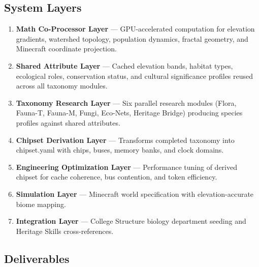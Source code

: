 \documentclass[11pt,letterpaper]{article}
\begin{document}
\subsection{System Layers}

\begin{enumerate}[leftmargin=2em]
\item \textbf{Math Co-Processor Layer} --- GPU-accelerated computation for elevation gradients, watershed topology, population dynamics, fractal geometry, and Minecraft coordinate projection.
\item \textbf{Shared Attribute Layer} --- Cached elevation bands, habitat types, ecological roles, conservation status, and cultural significance profiles reused across all taxonomy modules.
\item \textbf{Taxonomy Research Layer} --- Six parallel research modules (Flora, Fauna-T, Fauna-M, Fungi, Eco-Nets, Heritage Bridge) producing species profiles against shared attributes.
\item \textbf{Chipset Derivation Layer} --- Transforms completed taxonomy into chipset.yaml with chips, buses, memory banks, and clock domains.
\item \textbf{Engineering Optimization Layer} --- Performance tuning of derived chipset for cache coherence, bus contention, and token efficiency.
\item \textbf{Simulation Layer} --- Minecraft world specification with elevation-accurate biome mapping.
\item \textbf{Integration Layer} --- College Structure biology department seeding and Heritage Skills cross-references.
\end{enumerate}

\subsection{Deliverables}
\end{document}
